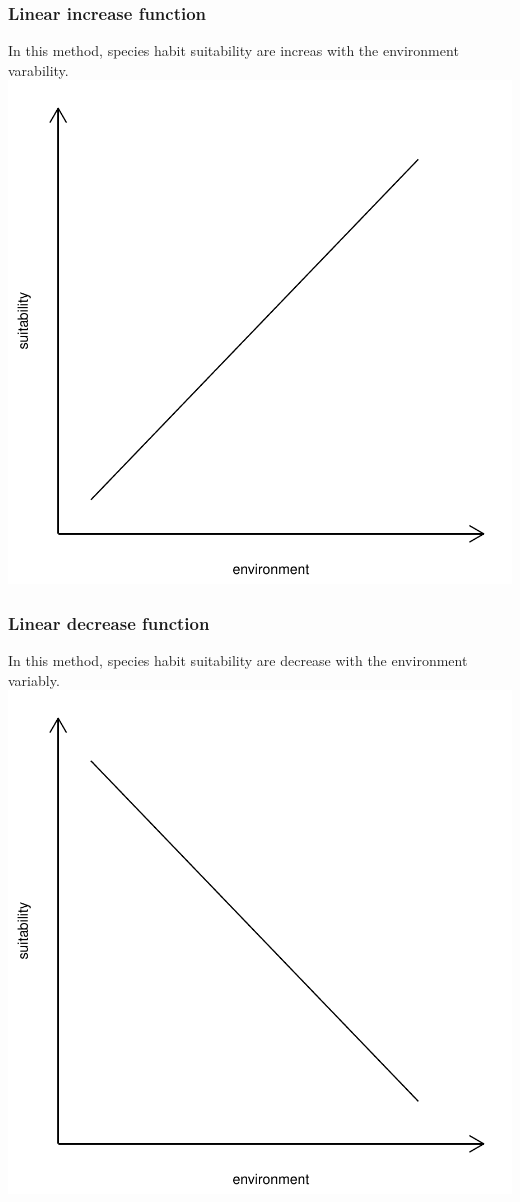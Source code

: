\documentclass{report}
\begin{document}
\subsubsection*{Linear increase function}
In this method, species habit suitability are increas with the environment varability.
\includegraphics{sdmvspecies-linear_increasing_function}

\subsubsection*{Linear decrease function}
In this method, species habit suitability are decrease with the environment variably.
\includegraphics{sdmvspecies-linear_decreasing_function}
\end{document}
